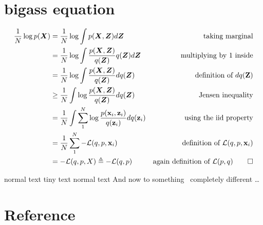 \documentclass[final]{beamer}
\newcommand{\x}{\mathbf{x}}
\newcommand{\Z}{\mathbf{Z}}
\newcommand{\z}{\mathbf{z}}
\newcommand{\LL}{\mathcal{L}}
\newcommand{\bv}[1]{\boldsymbol{#1}}
\begin{document}
\section{bigass equation}

\begin{frame}
{\tiny
\begin{equation}
\label{eq:elbo}
\begin{aligned}
\frac{1}{N} \log p(\bv{X}) &= \frac{1}{N} \log \int p(\bv{X},\bv{Z}) d\bv{Z} 
& \text{taking marginal} \\
& = \frac{1}{N} \log \int \frac{p(\bv{X},\bv{Z})}{q(\bv{Z})} q(\bv{Z})d\bv{Z} 
& \text{multiplying by 1 inside}\\
&=  \frac{1}{N} \log \int \frac{p(\bv{X},\bv{Z})}{q(\bv{Z})}dq(\bv{Z}) 
& \text{definition of } dq(\Z)\\
&\geq  \frac{1}{N} \int \log \frac{p(\bv{X},\bv{Z})}{q(\bv{Z})}dq(\bv{Z}) 
& \text{Jensen inequality}\\
&= \frac{1}{N} \int \sum_1^N \log \frac{p(\x_i, \z_i)}{q(\z_i)}dq(\z_i) 
& \text{using the iid property}\\
&= \frac{1}{N} \sum_1^N - \LL(q,p,\x_i)
& \text{definition of } \LL(q,p,\x_i)\\
& = -\mathcal{L}(q,p,X) \triangleq -\mathcal{L}(q,p)
& \text{again definition of } \LL(p,q) \qed
\end{aligned}
\end{equation}
}
\end{frame}

\begin{frame}
normal text
\tiny
tiny text
\normalsize
normal text
And now to something~\cite{guo2017improved} completely different \dots
\end{frame}

%


\section{Reference}
\begin{frame}
\printbibliography
\end{frame}
\end{document}
